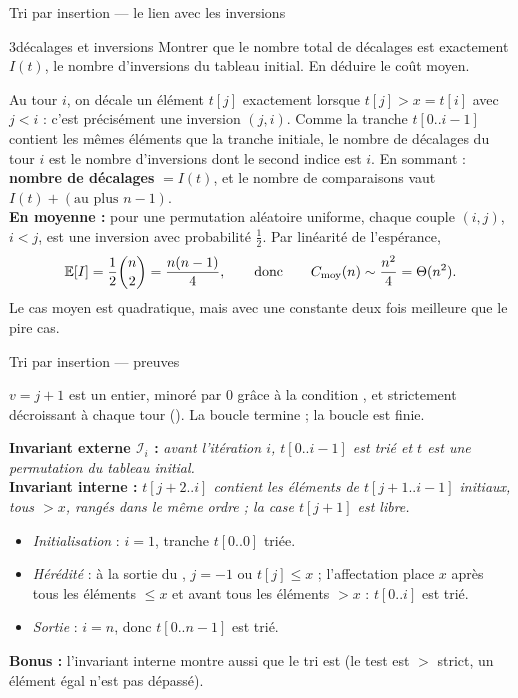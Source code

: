 \documentclass[11pt,aspectratio=169]{beamer}
\begin{document}
\begin{frame}[shrink=15]{Tri par insertion --- le lien avec les inversions}
\begin{exercice}{3}{décalages et inversions}
Montrer que le nombre total de décalages  est exactement $I(t)$, le
nombre d'inversions du tableau initial. En déduire le coût moyen.
\end{exercice}
\pause
\begin{soluce}
\small
Au tour $i$, on décale un élément $t[j]$ exactement lorsque $t[j]>x=t[i]$ avec $j<i$ :
c'est précisément une inversion $(j,i)$. Comme la tranche $t[0..i-1]$ contient les mêmes
éléments que la tranche initiale, le nombre de décalages du tour $i$ est le nombre
d'inversions dont le second indice est $i$. En sommant : \textbf{nombre de décalages}
$=I(t)$, et le nombre de comparaisons vaut $I(t)+(\text{au plus } n-1)$.\\[3pt]
\textbf{En moyenne :} pour une permutation aléatoire uniforme, chaque couple $(i,j)$, $i<j$,
est une inversion avec probabilité $\tfrac12$. Par linéarité de l'espérance,
\[
\mathbb E[I]=\frac12\binom n2=\frac{n(n-1)}4,\qquad\text{donc}\qquad
C_{\text{moy}}(n)\sim\frac{n^2}4=\Theta(n^2).
\]
Le cas moyen est quadratique, mais avec une constante deux fois meilleure que le pire cas.
\end{soluce}
\end{frame}

\begin{frame}[shrink=15]{Tri par insertion --- preuves}
\begin{terminaisonit}
$v=j+1$ est un entier, minoré par $0$ grâce à la condition , et strictement
décroissant à chaque tour (). La boucle  termine ; la boucle
 est finie.
\end{terminaisonit}
\vspace{3pt}
\begin{correction}
\small
\textbf{Invariant externe $\mathcal I_i$ :} \emph{avant l'itération $i$, $t[0..i-1]$ est
trié et $t$ est une permutation du tableau initial.}\\[2pt]
\textbf{Invariant interne :} \emph{$t[j+2..i]$ contient les éléments de $t[j+1..i-1]$
initiaux, tous $>x$, rangés dans le même ordre ; la case $t[j+1]$ est libre.}
\begin{itemize}\setlength\itemsep{1pt}
  \item \emph{Initialisation} : $i=1$, tranche $t[0..0]$ triée.
  \item \emph{Hérédité} : à la sortie du , $j=-1$ ou $t[j]\le x$ ; l'affectation
         place $x$ après tous les éléments $\le x$ et avant tous les
        éléments $>x$ : $t[0..i]$ est trié.
  \item \emph{Sortie} : $i=n$, donc $t[0..n-1]$ est trié.
\end{itemize}
\textbf{Bonus :} l'invariant interne montre aussi que le tri est 
(le test est $>$ strict, un élément égal n'est pas dépassé).
\end{correction}
\end{frame}
\end{document}
